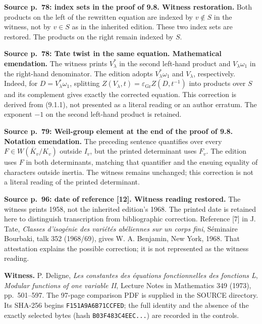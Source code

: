 \documentclass[10pt,letterpaper]{article}
\begin{document}
\begin{description}[style=nextline,leftmargin=2.6em,labelwidth=2.2em,font=\normalfont\bfseries]
\item[E56] \textbf{Source p.~78: index sets in the proof of 9.8. Witness restoration.}
Both products on the left of the rewritten equation are indexed by \(v\notin S\) in the witness, not by \(v\in S\) as in the inherited edition. These two index sets are restored. The products on the right remain indexed by \(S\).
\item[E57] \textbf{Source p.~78: Tate twist in the same equation. Mathematical emendation.}
The witness prints \(V_\lambda^*\) in the second left-hand product and \(V_\lambda\omega_1\) in the right-hand denominator. The edition adopts \(V_\lambda^*\omega_1\) and \(V_\lambda\), respectively. Indeed, for \(D=V_\lambda^*\omega_1\), splitting \(Z(V_\lambda,t)=\varepsilon_{\mathrm{Gr}}Z(D,t^{-1})\) into products over \(S\) and its complement gives exactly the corrected equation. This correction is derived from (9.1.1), not presented as a literal reading or an author erratum. The exponent \(-1\) on the second left-hand product is retained.
\item[E58] \textbf{Source p.~79: Weil-group element at the end of the proof of 9.8. Notation emendation.}
The preceding sentence quantifies over every \(F\in W(\overline K_v/K_v)\) outside \(I_v\), but the printed determinant uses \(F_v\). The edition uses \(F\) in both determinants, matching that quantifier and the ensuing equality of characters outside inertia. The witness remains unchanged; this correction is not a literal reading of the printed determinant.
\item[E59] \textbf{Source p.~96: date of reference [12]. Witness reading restored.}
The witness prints 1958, not the inherited edition's 1968. The printed date is retained here to distinguish transcription from bibliographic correction. Reference [7] in J. Tate, \emph{Classes d'isogénie des variétés abéliennes sur un corps fini}, Séminaire Bourbaki, talk 352 (1968/69), gives W. A. Benjamin, New York, 1968. That attestation explains the possible correction; it is not represented as the witness reading.
\end{description}
\par\medskip
\noindent\textbf{Witness.} P. Deligne, \emph{Les constantes des équations fonctionnelles des fonctions L},
\emph{Modular functions of one variable II}, Lecture Notes in Mathematics 349 (1973), pp.~501--597.
The 97-page comparison PDF is supplied in the SOURCE directory.
Its SHA-256 begins \texttt{F151A9A6B71CCFED}; the full identity and the absence of the exactly
selected bytes (hash \texttt{B03F483C4EEC...}) are recorded in the controls.

\endgroup
\end{document}
